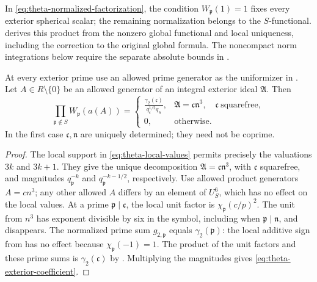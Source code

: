 In \eqref{eq:theta-normalized-factorization}, the condition
\(W_{\mathfrak p}(1)=1\) fixes every exterior spherical scalar; the
remaining normalization belongs to the \(S\)-functional.
 derives this product from the nonzero global
functional and local uniqueness, including the correction to the original
global formula.  The noncompact norm
integrations below require the separate absolute bounds in
.

\begin{corollary}
\label{cor:theta-exterior-coefficient}
At every exterior prime use an allowed prime generator as the uniformizer
in .  Let \(A\in R\setminus\{0\}\) be an allowed
generator of an integral exterior ideal \(\mathfrak A\).  Then
\begin{equation}\label{eq:theta-exterior-coefficient}
 \prod_{\mathfrak p\notin S}W_{\mathfrak p}(a(A))
 =
 \begin{cases}
 \displaystyle
 \frac{\gamma_2(\mathfrak c)}
      {q_{\mathfrak c}^{1/2}q_{\mathfrak n}},
   &\mathfrak A=\mathfrak c\mathfrak n^3,\quad
     \mathfrak c\ \text{squarefree},\\[2mm]
 0,&\text{otherwise}.
 \end{cases}
\end{equation}
In the first case \(\mathfrak c,\mathfrak n\) are uniquely determined;
they need not be coprime.
\end{corollary}

\begin{proof}
The local support in \eqref{eq:theta-local-values} permits precisely the
valuations \(3k\) and \(3k+1\).  They give the unique decomposition
\(\mathfrak A=\mathfrak c\mathfrak n^3\), with \(\mathfrak c\) squarefree,
and magnitudes \(q_{\mathfrak p}^{-k}\) and
\(q_{\mathfrak p}^{-k-1/2}\), respectively.  Use allowed product
generators \(A=cn^3\); any other allowed \(A\) differs by an element of
\(U_S^6\), which has no effect on the local values.  At a prime
\(\mathfrak p\mid\mathfrak c\), the local unit factor is
\(\chi_{\mathfrak p}(c/p)^2\).  The unit from \(n^3\) has exponent
divisible by six in the symbol, including when \(\mathfrak p\mid\mathfrak n\),
and disappears.  The normalized prime sum \(g_{2,\mathfrak p}\) equals
\(\gamma_2(\mathfrak p)\): the local additive sign from
 has no effect because
\(\chi_{\mathfrak p}(-1)=1\).  The product of the unit factors and these
prime sums is \(\gamma_2(\mathfrak c)\) by .
Multiplying the magnitudes gives \eqref{eq:theta-exterior-coefficient}.
\end{proof}

